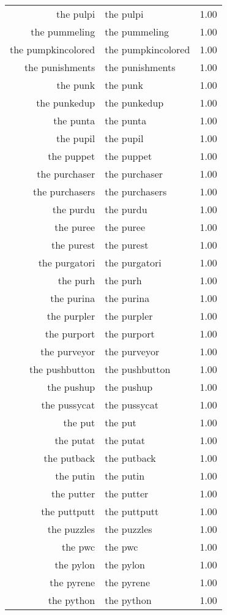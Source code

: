 \begin{table}[ht]
\begin{tabular}{rlr}
  the pulpi & the pulpi & 1.00 \\ 
  the pummeling & the pummeling & 1.00 \\ 
  the pumpkincolored & the pumpkincolored & 1.00 \\ 
  the punishments & the punishments & 1.00 \\ 
  the punk & the punk & 1.00 \\ 
  the punkedup & the punkedup & 1.00 \\ 
  the punta & the punta & 1.00 \\ 
  the pupil & the pupil & 1.00 \\ 
  the puppet & the puppet & 1.00 \\ 
  the purchaser & the purchaser & 1.00 \\ 
  the purchasers & the purchasers & 1.00 \\ 
  the purdu & the purdu & 1.00 \\ 
  the puree & the puree & 1.00 \\ 
  the purest & the purest & 1.00 \\ 
  the purgatori & the purgatori & 1.00 \\ 
  the purh & the purh & 1.00 \\ 
  the purina & the purina & 1.00 \\ 
  the purpler & the purpler & 1.00 \\ 
  the purport & the purport & 1.00 \\ 
  the purveyor & the purveyor & 1.00 \\ 
  the pushbutton & the pushbutton & 1.00 \\ 
  the pushup & the pushup & 1.00 \\ 
  the pussycat & the pussycat & 1.00 \\ 
  the put & the put & 1.00 \\ 
  the putat & the putat & 1.00 \\ 
  the putback & the putback & 1.00 \\ 
  the putin & the putin & 1.00 \\ 
  the putter & the putter & 1.00 \\ 
  the puttputt & the puttputt & 1.00 \\ 
  the puzzles & the puzzles & 1.00 \\ 
  the pwc & the pwc & 1.00 \\ 
  the pylon & the pylon & 1.00 \\ 
  the pyrene & the pyrene & 1.00 \\ 
  the python & the python & 1.00 \\ 

\end{tabular}
\end{table}
